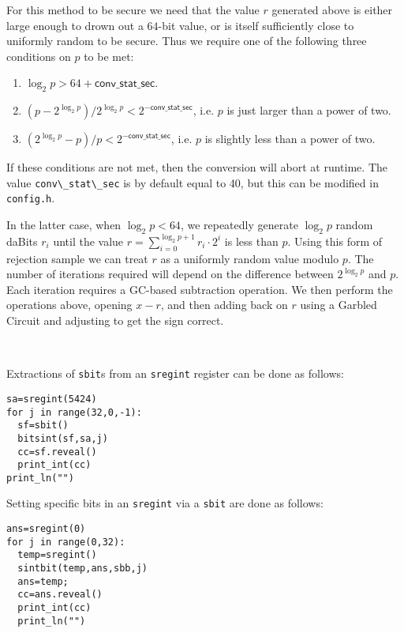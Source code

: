For this method to be secure we need that the value $r$ generated above is
either large enough to drown out a $64$-bit value, or is itself sufficiently close
to uniformly random to be secure.
Thus we require one of the following three conditions on $p$ to be met:
\begin{enumerate}
  \item $\log_2 p > 64+ \mathsf{conv\_stat\_sec}$.
  \item $(p - 2^{\log_2 p}) / 2^{\log_2 p} < 2^{-\mathsf{conv\_stat\_sec}}$, i.e. $p$ is just larger than a power of two.
  \item $(2^{\log_2 p}-p) / p < 2^{-\mathsf{conv\_stat\_sec}}$, i.e. $p$ is slightly less than a power of two.
\end{enumerate}
If these conditions are not met, then the conversion will abort at runtime.
The value \verb|conv\_stat\_sec| is by default equal to 40, but this can be modified in
\verb|config.h|.

In the latter case, when $\log_2 p < 64$, we repeatedly generate
$\log_2 p$ random daBits $r_i$ until the value
$r = \sum_{i=0}^{\log_2 p+1} r_i \cdot 2^i$ is less than $p$.
Using this form of rejection sample we can treat $r$ as a uniformly
random value modulo $p$.
The number of iterations required will depend on the difference between
$2^{\log_2 p}$ and $p$.
Each iteration requires a GC-based subtraction operation.
We then perform the operations above, opening $x-r$, and then adding back on $r$
using a Garbled Circuit and adjusting to get the sign correct.

~

Extractions of \verb|sbit|s from an \verb|sregint| register can be done as follows:
\begin{lstlisting}
sa=sregint(5424)
for j in range(32,0,-1):
  sf=sbit()
  bitsint(sf,sa,j)
  cc=sf.reveal()
  print_int(cc)
print_ln("")
\end{lstlisting}
Setting specific bits in an \verb|sregint| via a \verb|sbit| are done as follows:
\begin{lstlisting}
ans=sregint(0)
for j in range(0,32):
  temp=sregint()
  sintbit(temp,ans,sbb,j)
  ans=temp;
  cc=ans.reveal()
  print_int(cc)
  print_ln("")
\end{lstlisting}



